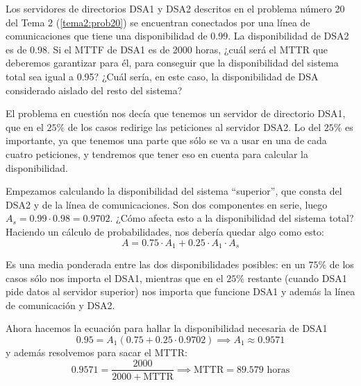\begin{problem}[10]
Los servidores de directorios DSA1 y DSA2 descritos en el problema número 20 del Tema 2 (\ref{tema2:prob20}) se encuentran conectados por una línea de comunicaciones que tiene una disponibilidad de 0.99. La disponibilidad de DSA2 es de 0.98. Si el MTTF de DSA1 es de 2000 horas, ¿cuál será el MTTR que deberemos garantizar para él, para conseguir que la disponibilidad del sistema total sea igual a 0.95? ¿Cuál sería, en este caso, la disponibilidad de DSA considerado aislado del resto del sistema?

\solution
{}

El problema en cuestión nos decía que tenemos un servidor de directorio DSA1, que en el $25\%$ de los casos redirige las peticiones al servidor DSA2. Lo del $25\%$ es importante, ya que tenemos una parte que sólo se va a usar en una de cada cuatro peticiones, y tendremos que tener eso en cuenta para calcular la disponibilidad.

Empezamos calculando la disponibilidad del sistema ``superior'', que consta del DSA2 y de la línea de comunicaciones. Son dos componentes en serie, luego $A_s = 0.99 · 0.98 = 0.9702$. ¿Cómo afecta esto a la disponibilidad del sistema total? Haciendo un cálculo de probabilidades, nos debería quedar algo como esto: \[ A = 0.75 · A_1 + 0.25 · A_1 · A_s \]

Es una media ponderada entre las dos disponibilidades posibles: en un $75\%$ de los casos sólo nos importa el DSA1, mientras que en el $25\%$ restante (cuando DSA1 pide datos al servidor superior) nos importa que funcione DSA1 y además la línea de comunicación y DSA2.

Ahora hacemos la ecuación para hallar la disponibilidad necesaria de DSA1 \[ 0.95 = A_1 (0.75 + 0.25 · 0.9702) \implies A_1 \approx 0.9571 \] y además resolvemos para sacar el MTTR: \[ 0.9571 = \frac{2000}{2000 + \text{MTTR}} \implies \text{MTTR} = 89.579 \text{ horas}\]

\end{problem}

